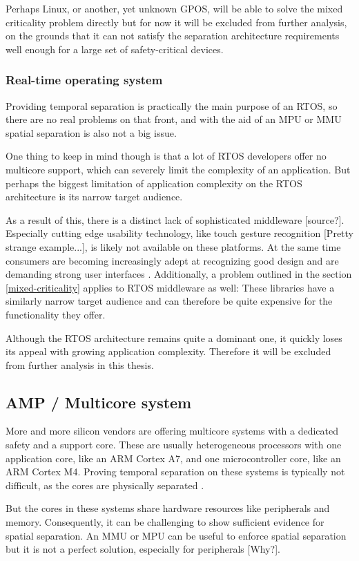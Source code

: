 Perhaps Linux, or another, yet unknown GPOS, will be able to solve the mixed criticality problem directly but for now it will be excluded from further analysis, on the grounds that it can not satisfy the separation architecture requirements well enough for a large set of safety-critical devices.
\subsubsection{Real-time operating system}
Providing temporal separation is practically the main purpose of an RTOS, so there are no real problems on that front, and with the aid of an \gls{MPU} or \gls{MMU} spatial separation is also not a big issue.

One thing to keep in mind though is that a lot of RTOS developers offer no multicore support, which can severely limit the complexity of an application. But perhaps the biggest limitation of application complexity on the RTOS architecture is its narrow target audience.

As a result of this, there is a distinct lack of sophisticated middleware [source?]. Especially cutting edge usability technology, like touch gesture recognition [Pretty strange example...], is likely not available on these platforms. At the same time consumers are becoming increasingly adept at recognizing good design and are demanding strong user interfaces \cite{HBR.September2015}.
Additionally, a problem outlined in the section \ref{mixed-criticality} applies to RTOS middleware as well: These libraries have a similarly narrow target audience and can therefore be quite expensive for the functionality they offer.

Although the RTOS architecture remains quite a dominant one, it quickly loses its appeal with growing application complexity. Therefore it will be excluded from further analysis in this thesis.
\subsection{AMP / Multicore system}
More and more silicon vendors are offering multicore systems with a dedicated safety and a support core. These are usually heterogeneous processors with one application core, like an ARM Cortex A7, and one microcontroller core, like an ARM Cortex M4. Proving temporal separation on these systems is typically not difficult, as the cores are physically separated \cite{Wittenstein.temporal.2017}.

But the cores in these systems share hardware resources like peripherals and memory. Consequently, it can be challenging to show sufficient evidence for spatial separation. An \gls{MMU} or \gls{MPU} can be useful to enforce spatial separation but it is not a perfect solution, especially for peripherals [Why?]. 
